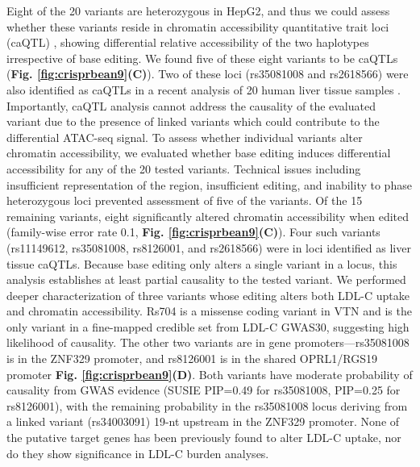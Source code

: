 \documentclass[a4paper, titlepage, openright]{book}
\begin{document}
Eight of the 20 variants are heterozygous in HepG2, and thus we could assess whether these variants reside in chromatin accessibility quantitative trait loci (caQTL) \citep{degner2012dnase}, showing differential relative accessibility of the two haplotypes irrespective of base editing. We found five of these eight variants to be caQTLs (\textbf{Fig. \ref{fig:crisprbean9}(C)}). Two of these loci (rs35081008 and rs2618566) were also identified as caQTLs in a recent analysis of 20 human liver tissue samples \citep{currin2021genetic}. Importantly, caQTL analysis cannot address the causality of the evaluated variant due to the presence of linked variants which could contribute to the differential ATAC-seq signal. To assess whether individual variants alter chromatin accessibility, we evaluated whether base editing induces differential accessibility for any of the 20 tested variants. Technical issues including insufficient representation of the region, insufficient editing, and inability to phase heterozygous loci prevented assessment of five of the variants. Of the 15 remaining variants, eight significantly altered chromatin accessibility when edited (family-wise error rate 0.1, \textbf{Fig. \ref{fig:crisprbean9}(C)}). Four such variants (rs11149612, rs35081008, rs8126001, and rs2618566) were in loci identified as liver tissue caQTLs. Because base editing only alters a single variant in a locus, this analysis establishes at least partial causality to the tested variant. We performed deeper characterization of three variants whose editing alters both LDL-C uptake and chromatin accessibility. Rs704 is a missense coding variant in VTN and is the only variant in a fine-mapped credible set from LDL-C GWAS30, suggesting high likelihood of causality. The other two variants are in gene promoters—rs35081008 is in the ZNF329 promoter, and rs8126001 is in the shared OPRL1/RGS19 promoter \textbf{Fig. \ref{fig:crisprbean9}(D)}. Both variants have moderate probability of causality from GWAS evidence (SUSIE PIP=0.49 for rs35081008, PIP=0.25 for rs8126001), with the remaining probability in the rs35081008 locus deriving from a linked variant (rs34003091) 19-nt upstream in the ZNF329 promoter. None of the putative target genes has been previously found to alter LDL-C uptake, nor do they show significance in LDL-C burden analyses. 
\end{document}
